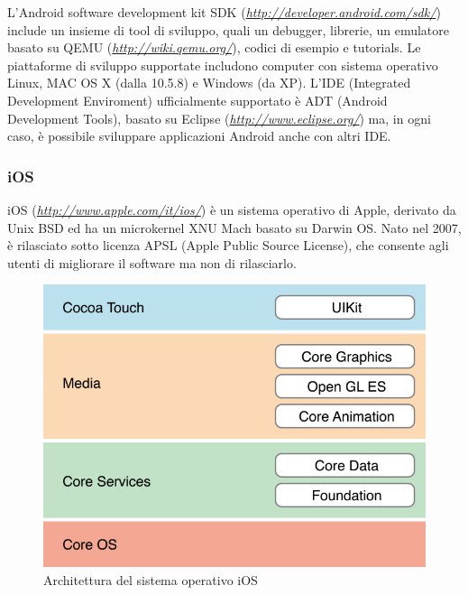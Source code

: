 L'Android software development kit SDK (\emph{\url{http://developer.android.com/sdk/}}) include un insieme di tool di sviluppo, quali un debugger, librerie, un emulatore basato su QEMU (\emph{\url{http://wiki.qemu.org/}}), codici di esempio e tutorials.
Le piattaforme di sviluppo supportate includono computer con sistema operativo Linux, MAC OS X (dalla 10.5.8) e Windows (da XP).
L'IDE (Integrated Development Enviroment) ufficialmente supportato è ADT (Android Development Tools), basato su Eclipse (\emph{\url{http://www.eclipse.org/}}) ma, in ogni caso, è possibile sviluppare applicazioni Android anche con altri IDE.

\subsubsection{iOS}
iOS (\emph{\url{http://www.apple.com/it/ios/}}) è un sistema operativo di Apple, derivato da Unix BSD ed ha un microkernel XNU Mach basato su Darwin OS.
Nato nel 2007, è rilasciato sotto licenza APSL (Apple Public Source License), che consente agli utenti di migliorare il software ma non di rilasciarlo.\\

\begin{figure}[h!]
\begin{center}
\includegraphics[scale=0.5]{imgs/ios_architecture.png} 
\caption{Architettura del sistema operativo iOS\label{iosarchitecture}}
\end{center}
\end{figure}

